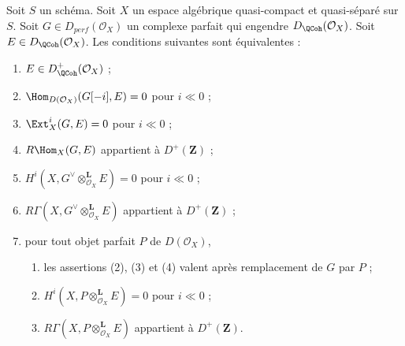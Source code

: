 \begin{proposition}
\label{proposition-detecting-bounded-below}
Soit $S$ un sch\'ema.
Soit $X$ un espace alg\'ebrique quasi-compact et quasi-s\'epar\'e sur $S$.
Soit $G\in D_{perf}(\mathcal{O}_X)$ un complexe parfait qui engendre
$D_\QCoh(\mathcal{O}_X)$. Soit $E\in D_\QCoh(\mathcal{O}_X)$.
Les conditions suivantes sont \'equivalentes :
\begin{enumerate}
\item $E\in D^+_\QCoh(\mathcal{O}_X)$ ;
\item $\Hom_{D(\mathcal{O}_X)}(G[-i],E)=0$ pour $i\ll0$ ;
\item $\Ext^i_X(G,E)=0$ pour $i\ll0$ ;
\item $R\Hom_X(G,E)$ appartient \`a $D^+(\mathbf{Z})$ ;
\item $H^i(X,G^\vee\otimes_{\mathcal{O}_X}^\mathbf{L}E)=0$ pour $i\ll0$ ;
\item $R\Gamma(X,G^\vee\otimes_{\mathcal{O}_X}^\mathbf{L}E)$ appartient \`a
$D^+(\mathbf{Z})$ ;
\item pour tout objet parfait $P$ de $D(\mathcal{O}_X)$,
\begin{enumerate}
\item les assertions (2), (3) et (4) valent apr\`es remplacement de $G$ par
$P$ ;
\item $H^i(X,P\otimes_{\mathcal{O}_X}^\mathbf{L}E)=0$ pour $i\ll0$ ;
\item $R\Gamma(X,P\otimes_{\mathcal{O}_X}^\mathbf{L}E)$ appartient \`a
$D^+(\mathbf{Z})$.
\end{enumerate}
\end{enumerate}
\end{proposition}

